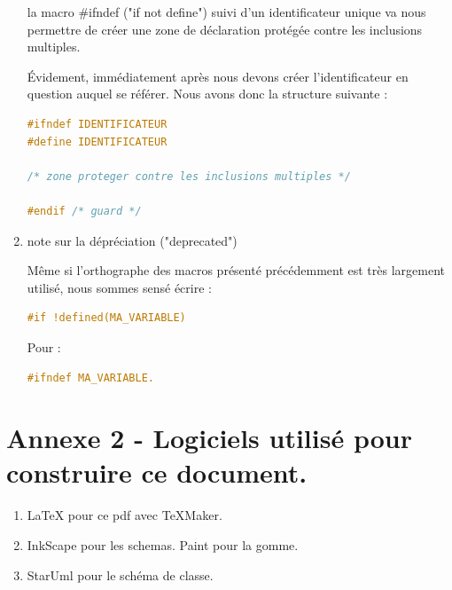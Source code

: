 \documentclass[a4paper,11pt]{article}
\begin{document}
\begin{enumerate}[label=-]
la macro \#ifndef ("if not define") suivi d'un identificateur unique va nous permettre de créer une zone de déclaration protégée contre les inclusions multiples.

Évidement, immédiatement après nous devons créer l'identificateur en question auquel se référer. Nous avons donc la structure suivante : 


\begin{lstlisting}[language=c++, style=eclipse]
#ifndef IDENTIFICATEUR
#define IDENTIFICATEUR
 
/* zone proteger contre les inclusions multiples */
 
#endif /* guard */
\end{lstlisting}

\item note sur la dépréciation ("deprecated")

Même si l'orthographe des macros présenté précédemment est très largement utilisé, nous sommes sensé écrire : 

\begin{lstlisting}[language=c++, style=eclipse]
#if !defined(MA_VARIABLE)
\end{lstlisting}

Pour : 

\begin{lstlisting}[language=c++, style=eclipse]
#ifndef MA_VARIABLE.
\end{lstlisting}

\end{enumerate}



\newpage


\section*{Annexe 2 - Logiciels utilisé pour construire ce document.}
\vspace{0.35cm}
\begin{enumerate}[label=-]
\vspace{-0.2cm}
\item \LaTeX \hspace{0.05cm} pour ce pdf avec \TeX Maker.
\vspace{-0.2cm}
\item InkScape pour les schemas. Paint pour la gomme.
\vspace{-0.2cm}
\item StarUml pour le schéma de classe.

\end{enumerate}
\end{document}

